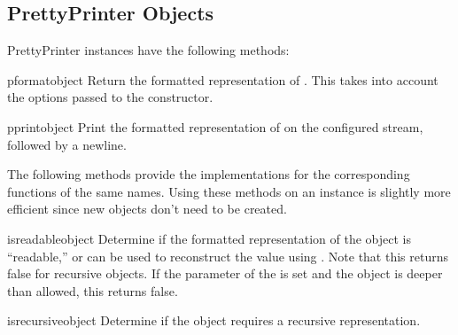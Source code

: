 \subsection{PrettyPrinter Objects}
\label{PrettyPrinter Objects}

PrettyPrinter instances have the following methods:


\begin{funcdesc}{pformat}{object}
Return the formatted representation of .  This takes into
account the options passed to the  constructor.
\end{funcdesc}

\begin{funcdesc}{pprint}{object}
Print the formatted representation of  on the configured
stream, followed by a newline.
\end{funcdesc}

The following methods provide the implementations for the
corresponding functions of the same names.  Using these methods on an
instance is slightly more efficient since new 
objects don't need to be created.

\begin{funcdesc}{isreadable}{object}
Determine if the formatted representation of the object is
``readable,'' or can be used to reconstruct the value using
.  Note that this returns false for
recursive objects.  If the  parameter of the
 is set and the object is deeper than allowed,
this returns false.
\end{funcdesc}

\begin{funcdesc}{isrecursive}{object}
Determine if the object requires a recursive representation.
\end{funcdesc}
